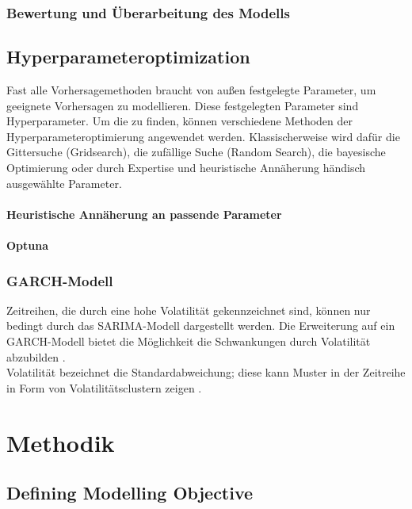\documentclass[12pt]{report}
\begin{document}
	\subsection{Bewertung und Überarbeitung des Modells}%
	
	\section{Hyperparameteroptimization}
	Fast alle Vorhersagemethoden braucht von außen festgelegte Parameter, um geeignete Vorhersagen zu modellieren. Diese festgelegten Parameter sind Hyperparameter. Um die zu finden, können verschiedene Methoden der Hyperparameteroptimierung angewendet werden. Klassischerweise wird dafür die Gittersuche (Gridsearch), die zufällige Suche (Random Search), die bayesische Optimierung oder durch Expertise und heuristische Annäherung händisch ausgewählte Parameter. 
	\subsubsection{Heuristische Annäherung an passende Parameter}
	\subsubsection{Optuna}
	\subsection{GARCH-Modell}
	Zeitreihen, die durch eine hohe Volatilität gekennzeichnet sind, können nur bedingt durch das SARIMA-Modell dargestellt werden. Die Erweiterung auf ein GARCH-Modell bietet die Möglichkeit die Schwankungen durch Volatilität abzubilden \cite[S. 148]{Vogel.2015}. \\
	Volatilität bezeichnet die Standardabweichung; diese kann Muster in der Zeitreihe in Form von Volatilitätsclustern  zeigen \cite[S. 145]{Vogel.2015}.
	
	\chapter{Methodik} %
	\section{Defining Modelling Objective}
\end{document}
